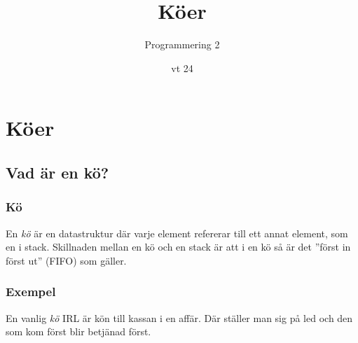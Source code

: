 \documentclass[aspectratio=169]{beamer}
\begin{document}

\newcommand{\fortt}{\texttt{for}}
\newcommand{\whilett}{\texttt{while}}
\newcommand{\iftt}{\texttt{if}}


\title{Köer}
\date{vt 24}
\author{Programmering 2}

\maketitle

\tableofcontents

\section{Köer}

\subsection{Vad är en kö?}

\begin{frame}
	\frametitle{Kö}
	
	En \textit{kö} är en datastruktur där varje element refererar till ett annat element, som en i stack. Skillnaden mellan en kö och en stack är att i en kö så är det ''först in först ut'' (FIFO) som gäller.
	
\end{frame}

\begin{frame}
	\frametitle{Exempel}
	
	En vanlig \textit{kö} IRL är kön till kassan i en affär. Där ställer man sig på led och den som kom först blir betjänad först.
	
\end{frame}
\end{document}
